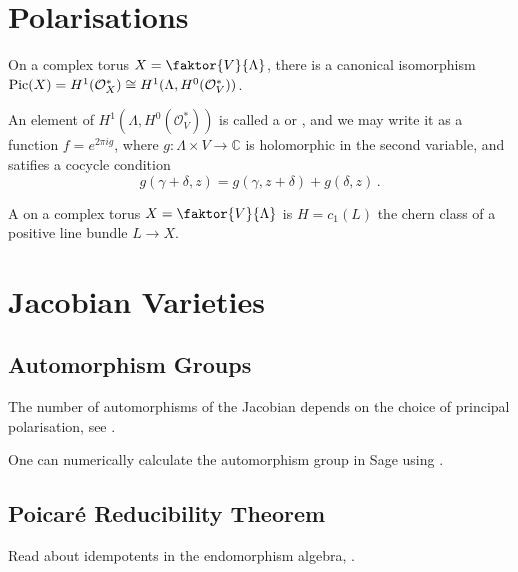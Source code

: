 \documentclass{article}
\begin{document}
\section{Polarisations}
\begin{lemma}
	On a complex torus $X = \faktor{V}{\Lambda}$, there is a canonical isomorphism $\operatorname{Pic}(X) = H^1(\mathcal{O}_X^\ast) \cong H^1(\Lambda , H^0(\mathcal{O}_V^\ast))$. 
\end{lemma}
An element of $H^1(\Lambda , H^0(\mathcal{O}_V^\ast))$ is called a  or , and we may write it as a function $f = e^{2 \pi i g}$, where $g:\Lambda \times V \to \mathbb{C}$ is holomorphic in the second variable, and satifies a cocycle condition 
\[
g(\gamma + \delta, z) = g(\gamma, z+\delta) + g(\delta, z) \, . 
\] 


\begin{definition}
	A  on a complex torus $X = \faktor{V}{\Lambda}$ is $H=  c_1(L)$ the chern class of a positive line bundle $L \to X$. 
\end{definition}


\section{Jacobian Varieties}




\subsection{Automorphism Groups}
The number of automorphisms of the Jacobian depends on the choice of principal polarisation, see \cite{Lee2018}. 

One can numerically calculate the automorphism group in Sage using \cite{Bruin2019}. 


\subsection{Poicar\'e Reducibility Theorem}
Read about idempotents in the endomorphism algebra, \cite{Kani1989}. 


\end{document}
